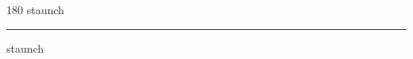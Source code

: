 
\begin{frame}
\begin{center}
\begin{turn}{180}
{\fontsize{2.5cm}{1em}\selectfont staunch}
\end{turn}
\vspace{1em}\par  
\hrule
\vspace{1em}\par  
{\fontsize{2.5cm}{1em}\selectfont staunch}
\end{center}
\end{frame}
